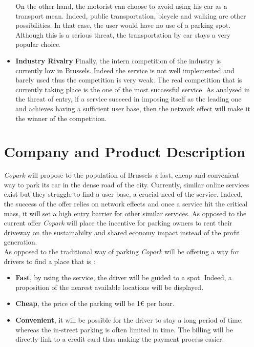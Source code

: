 \documentclass[12pt,a4paper,oneside]{book}
\newcommand{\bp}{\textit{Copark }}
\begin{document}
\begin{itemize}
On the other hand, the motorist can choose to avoid using his car as a transport mean. Indeed, public transportation, bicycle and walking are other possibilities. In that case, the user would have no use of a parking spot. Although this is a serious threat, the transportation by car stays a very popular choice.
\item \textbf{Industry Rivalry} Finally, the intern competition of the industry is currently low in Brussels. Indeed the service is not well implemented and barely used thus the competition is very weak. The real competition that is currently taking place is the one of the most successful service. As analysed in the threat of entry, if a service succeed in imposing itself as the leading one and achieves  having a sufficient user base, then the network effect will make it the winner of the competition.
\end{itemize}

\chapter{Company and Product Description}

\bp will propose to the population of Brussels a fast, cheap and convenient way to park its car in the dense road of the city. Currently, similar online services exist but they struggle to find a user base, a crucial need of the service. Indeed, the success of the offer relies on network effects and once a service hit the critical mass, it will set a high entry barrier for other similar services. As opposed to the current offer \bp will place the incentive for parking owners to rent their driveway on the sustainabilty and shared economy impact instead of the profit generation.\\

As opposed to the traditional way of parking \bp will be offering a way for drivers to find a place that is :
\begin{itemize}
\item \textbf{Fast}, by using the service, the driver will be guided to a spot. Indeed, a proposition of the nearest available locations will be displayed.
\item \textbf{Cheap}, the price of the parking will be 1\euro{} per hour.
\item \textbf{Convenient}, it will be possible for the driver to stay a long period of time, whereas the in-street parking is often limited in time. The billing will be directly link to a credit card thus making the payment process easier.
\end{itemize} 
\end{document}

